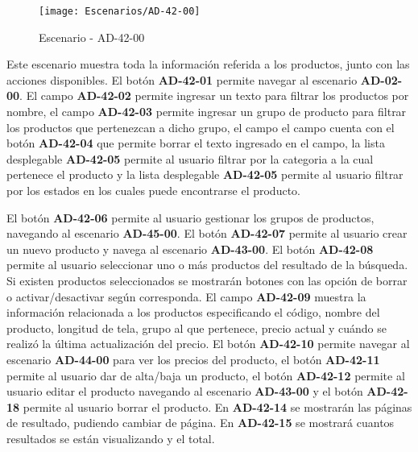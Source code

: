 \begin{figure}[H]
\centering
\texttt{[image: Escenarios/AD-42-00]}
\caption{Escenario - AD-42-00}
\label{fig:AD-42-00}
\end{figure}

Este escenario muestra toda la información referida a los productos, junto con las acciones disponibles.
El botón \textbf{AD-42-01} permite navegar al escenario \textbf{AD-02-00}. El campo \textbf{AD-42-02} permite ingresar un texto para filtrar los productos por nombre, el campo \textbf{AD-42-03} permite ingresar un grupo de producto para filtrar los productos que pertenezcan a dicho grupo, el campo el campo cuenta con el botón \textbf{AD-42-04} que permite borrar el texto ingresado en el campo, la lista desplegable \textbf{AD-42-05} permite al usuario filtrar por la categoria a la cual pertenece el producto y la lista desplegable \textbf{AD-42-05} permite al usuario filtrar por los estados en los cuales puede encontrarse el producto.

El botón \textbf{AD-42-06} permite al usuario gestionar los grupos de productos, navegando al escenario \textbf{AD-45-00}. El botón \textbf{AD-42-07} permite al usuario crear un nuevo producto y navega al escenario \textbf{AD-43-00}.
El botón \textbf{AD-42-08} permite al usuario seleccionar uno o más productos del resultado de la búsqueda. Si existen productos seleccionados se mostrarán botones con las opción de borrar o activar/desactivar según corresponda. El campo \textbf{AD-42-09} muestra la información relacionada a los productos especificando el código, nombre del producto, longitud de tela, grupo al que pertenece, precio actual y cuándo se realizó la última actualización del precio. El botón \textbf{AD-42-10} permite navegar al escenario \textbf{AD-44-00} para ver los precios del producto, el botón \textbf{AD-42-11} permite al usuario dar de alta/baja un producto, el botón \textbf{AD-42-12} permite al usuario editar el producto navegando al escenario \textbf{AD-43-00} y el botón \textbf{AD-42-18} permite al usuario borrar el producto. 
En \textbf{AD-42-14} se mostrarán las páginas de resultado, pudiendo cambiar de página. En \textbf{AD-42-15} se mostrará cuantos resultados se están visualizando y el total.
\clearpage

